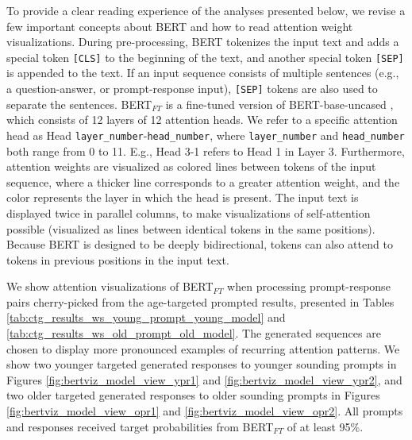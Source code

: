 To provide a clear reading experience of the analyses presented below, we revise a few important concepts about BERT and how to read attention weight visualizations. During pre-processing, BERT tokenizes the input text and adds a special token \texttt{[CLS]} to the beginning of the text, and another special token \texttt{[SEP]} is appended to the text. If an input sequence consists of multiple sentences (e.g., a question-answer, or prompt-response input), \texttt{[SEP]} tokens are also used to separate the sentences. BERT$_{FT}$ is a fine-tuned version of BERT-base-uncased \citep{devlin-etal-2019-bert}, which consists of 12 layers of 12 attention heads. We refer to a specific attention head as Head \texttt{layer\_number}-\texttt{head\_number}, where \texttt{layer\_number} and \texttt{head\_number} both range from 0 to 11. E.g., Head 3-1 refers to Head 1 in Layer 3. Furthermore, attention weights are visualized as colored lines between tokens of the input sequence, where a thicker line corresponds to a greater attention weight, and the color represents the layer in which the head is present. The input text is displayed twice in parallel columns, to make visualizations of self-attention possible (visualized as lines between identical tokens in the same positions). Because BERT is designed to be deeply bidirectional, tokens can also attend to tokens in previous positions in the input text.

We show attention visualizations of BERT$_{FT}$ when processing prompt-response pairs cherry-picked from the age-targeted prompted results, presented in Tables \ref{tab:ctg_results_ws_young_prompt_young_model} and \ref{tab:ctg_results_ws_old_prompt_old_model}. The generated sequences are chosen to display more pronounced examples of recurring attention patterns. We show two younger targeted generated responses to younger sounding prompts in Figures \ref{fig:bertviz_model_view_ypr1} and \ref{fig:bertviz_model_view_ypr2}, and two older targeted generated responses to older sounding prompts in Figures \ref{fig:bertviz_model_view_opr1} and \ref{fig:bertviz_model_view_opr2}. All prompts and responses received target probabilities from BERT$_{FT}$ of at least 95\%.

